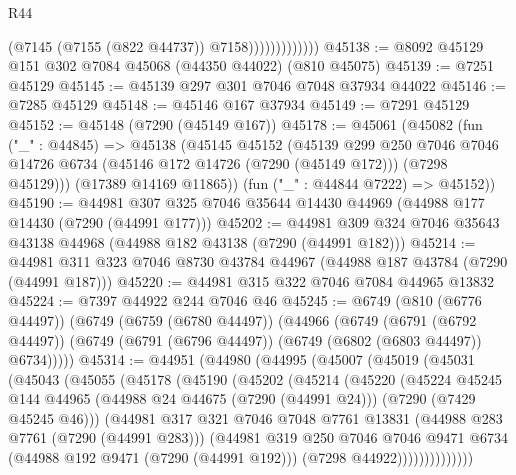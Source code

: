 \begin{lexlean}{R44}
\begin{coremodule}
{                            (@7145 (@7155 (@822 @44737)) @7158)))))))))))))
@45138 := @8092 @45129 @151 @302 @7084 @45068 (@44350 @44022) (@810 @45075)
@45139 := @7251 @45129
@45145 := @45139 @297 @301 @7046 @7048 @37934 @44022
@45146 := @7285 @45129
@45148 := @45146 @167 @37934
@45149 := @7291 @45129
@45152 := @45148 (@7290 (@45149 @167))
@45178 := @45061
    (@45082
      (fun ("_" : @44845) =>
      @45138
        (@45145
          @45152
          (@45139
            @299
            @250
            @7046
            @7046
            @14726
            @6734
            (@45146 @172 @14726 (@7290 (@45149 @172)))
            (@7298 @45129)))
        (@17389 @14169 @11865))
      (fun ("_" : @44844 @7222) => @45152))
@45190 := @44981 @307 @325 @7046 @35644 @14430 @44969 (@44988 @177 @14430 (@7290 (@44991 @177)))
@45202 := @44981 @309 @324 @7046 @35643 @43138 @44968 (@44988 @182 @43138 (@7290 (@44991 @182)))
@45214 := @44981 @311 @323 @7046 @8730 @43784 @44967 (@44988 @187 @43784 (@7290 (@44991 @187)))
@45220 := @44981 @315 @322 @7046 @7084 @44965 @13832
@45224 := @7397 @44922 @244 @7046 @46
@45245 := @6749
    (@810 (@6776 @44497))
    (@6749
      (@6759 (@6780 @44497))
      (@44966
        (@6749
          (@6791 (@6792 @44497))
          (@6749 (@6791 (@6796 @44497)) (@6749 (@6802 (@6803 @44497)) @6734)))))
@45314 := @44951
    (@44980
      (@44995
        (@45007
          (@45019
            (@45031
              (@45043
                (@45055
                  (@45178
                    (@45190
                      (@45202
                        (@45214
                          (@45220
                            (@45224
                              @45245
                              @144
                              @44965
                              (@44988 @24 @44675 (@7290 (@44991 @24)))
                              (@7290 (@7429 @45245 @46)))
                            (@44981
                              @317
                              @321
                              @7046
                              @7048
                              @7761
                              @13831
                              (@44988 @283 @7761 (@7290 (@44991 @283)))
                              (@44981
                                @319
                                @250
                                @7046
                                @7046
                                @9471
                                @6734
                                (@44988 @192 @9471 (@7290 (@44991 @192)))
                                (@7298 @44922))))))))))))))
}
\end{coremodule}
\end{lexlean}
